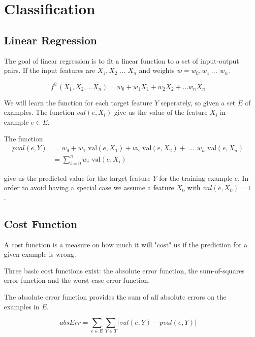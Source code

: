 \section{Classification}\label{sec:classification}



\subsection{Linear Regression}
The goal of linear regression is to fit a linear function to a set of input-output pairs. 
If the input features are $X_1,X_2 \text{ ... } X_n$ and weights $\overline{w} = w_0, w_1 \text{ ... } w_n$.

$$f^{\overline{w}}(X_1,X_2, ... X_n) = w_0 + w_1 X_1 + w_2 X_2 + ... w_n X_n $$ 

We will learn the function for each target feature $Y$ seperately, so given a set $E$ of examples.
The function $val(e,X_i)$ give us the value of the feature $X_i$ in example $e \in E$. 

The function 
\begin{align}
pval(e,Y) &= w_0 + w_1 \text{ val}(e,X_1) + w_2 \text{ val}(e,X_2) + \text{ ... } w_n \text{ val}(e,X_n) \\
&= \sum^n_{i=0} w_i \text{ val}(e,X_i)
\end{align}

give us the predicted value for the target feature $Y$ for the training example $e$.
In order to avoid having a special case we assume a feature $X_0$ with $val(e,X_0)=1$.
\begin{flushright}
\cite[p. 304]{AI2010}
\end{flushright}


\subsection{Cost Function}
A cost function is a measure on how much it will "cost" us if the prediction for a given example is wrong.

Three basic cost functions exist: the absolute error function, the sum-of-squares error function and 
the worst-case error function.
 
The absolute error function provides the sum of all absolute errors on the examples in $E$.

$$absErr = \sum_{e \in E}\sum_{Y \in T} |val(e,Y) - pval(e,Y)|$$

